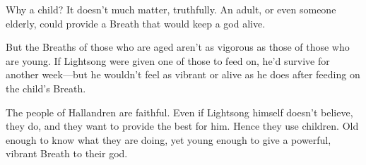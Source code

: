 Why a child? It doesn’t much matter, truthfully. An adult, or even someone elderly, could provide a Breath that would keep a god alive.

But the Breaths of those who are aged aren’t as vigorous as those of those who are young. If Lightsong were given one of those to feed on, he’d survive for another week—but he wouldn’t feel as vibrant or alive as he does after feeding on the child’s Breath.

The people of Hallandren are faithful. Even if Lightsong himself doesn’t believe, they do, and they want to provide the best for him. Hence they use children. Old enough to know what they are doing, yet young enough to give a powerful, vibrant Breath to their god.



